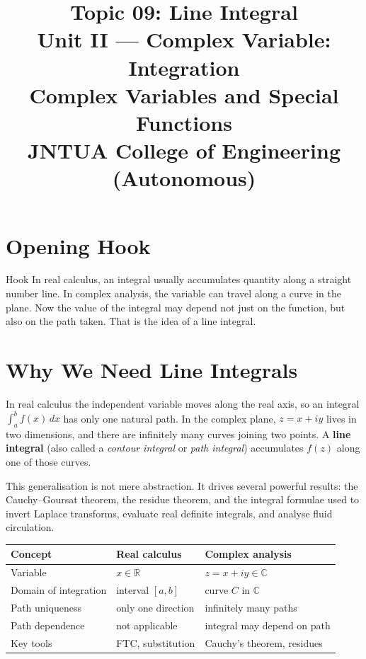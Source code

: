 \documentclass[12pt,a4paper]{article}
\title{\textbf{Topic 09: Line Integral}\\[0.5em]
       \large Unit II --- Complex Variable: Integration\\
       Complex Variables and Special Functions\\
       JNTUA College of Engineering (Autonomous)}
\author{}
\date{}
\begin{document}
\maketitle
\tableofcontents
\newpage

\section*{Opening Hook}
\begin{curiositybox}{Hook}
In real calculus, an integral usually accumulates quantity along a straight
number line. In complex analysis, the variable can travel along a curve in
the plane. Now the value of the integral may depend not just on the function,
but also on the path taken. That is the idea of a line integral.
\end{curiositybox}

\section{Why We Need Line Integrals}
In real calculus the independent variable moves along the real axis, so an
integral $\int_a^b f(x)\,dx$ has only one natural path. In the complex plane,
$z = x + iy$ lives in two dimensions, and there are infinitely many curves
joining two points. A \textbf{line integral} (also called a \emph{contour
integral} or \emph{path integral}) accumulates $f(z)$ along one of those
curves.

This generalisation is not mere abstraction. It drives several powerful
results: the Cauchy--Goursat theorem, the residue theorem, and the integral
formulae used to invert Laplace transforms, evaluate real definite integrals,
and analyse fluid circulation.

\begin{center}
\begin{tabular}{@{}lll@{}}
\toprule
\textbf{Concept} & \textbf{Real calculus} & \textbf{Complex analysis} \\
\midrule
Variable & $x \in \mathbb{R}$ & $z = x + iy \in \mathbb{C}$ \\
Domain of integration & interval $[a,b]$ & curve $C$ in $\mathbb{C}$ \\
Path uniqueness & only one direction & infinitely many paths \\
Path dependence & not applicable & integral may depend on path \\
Key tools & FTC, substitution & Cauchy's theorem, residues \\
\bottomrule
\end{tabular}
\end{center}
\end{document}

